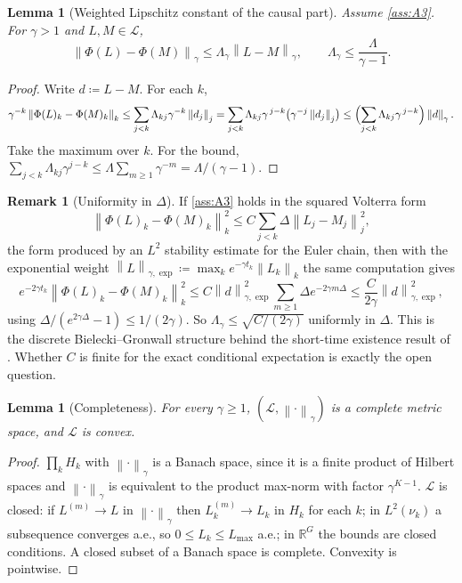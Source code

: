 \documentclass[11pt,a4paper]{article}
\theoremstyle{plain}
\newtheorem{lemma}[theorem]{Lemma}
\theoremstyle{definition}
\theoremstyle{definition}
\newtheorem{remark}[theorem]{Remark}
\newcommand{\R}{\mathbb{R}}
\newcommand{\norm}[1]{\left\lVert #1 \right\rVert}
\newcommand{\Lev}{L}
\newcommand{\Phimap}{\Phi}
\newcommand{\Lset}{\mathcal{L}}
\newcommand{\Lmax}{L_{\max}}
\begin{document}
\begin{lemma}[Weighted Lipschitz constant of the causal part]\label{lem:weighted}
Assume \cref{ass:A3}. For $\gamma > 1$ and $\Lev, M \in \Lset$,
\[
  \norm{\Phimap(\Lev) - \Phimap(M)}_\gamma \le \Lambda_\gamma \norm{\Lev - M}_\gamma, \qquad \Lambda_\gamma \le \frac{\Lambda}{\gamma - 1}.
\]
\end{lemma}

\begin{proof}
Write $d \coloneqq \Lev - M$. For each $k$,
\[
  \gamma^{-k} \norm{\Phimap(\Lev)_k - \Phimap(M)_k}_k
  \le \sum_{j < k} \Lambda_{kj} \gamma^{-k} \norm{d_j}_j
  = \sum_{j < k} \Lambda_{kj} \gamma^{\,j-k} \bigl( \gamma^{-j} \norm{d_j}_j \bigr)
  \le \Bigl( \sum_{j < k} \Lambda_{kj} \gamma^{\,j-k} \Bigr) \norm{d}_\gamma .
\]
Take the maximum over $k$. For the bound, $\sum_{j < k} \Lambda_{kj} \gamma^{j-k} \le \Lambda \sum_{m \ge 1} \gamma^{-m} = \Lambda/(\gamma - 1)$.
\end{proof}

\begin{remark}[Uniformity in $\Delta$]\label{rem:uniform}
If \cref{ass:A3} holds in the squared Volterra form
\[
  \norm{\Phimap(\Lev)_k - \Phimap(M)_k}_k^2 \le C \sum_{j < k} \Delta \norm{\Lev_j - M_j}_j^2,
\]
the form produced by an $L^2$ stability estimate for the Euler chain, then with the exponential weight $\norm{\Lev}_{\gamma, \exp} \coloneqq \max_k e^{-\gamma t_k} \norm{\Lev_k}_k$ the same computation gives
\[
  e^{-2\gamma t_k} \norm{\Phimap(\Lev)_k - \Phimap(M)_k}_k^2
  \le C \norm{d}^2_{\gamma, \exp} \sum_{m \ge 1} \Delta e^{-2\gamma m \Delta}
  \le \frac{C}{2\gamma} \norm{d}^2_{\gamma, \exp},
\]
using $\Delta / (e^{2\gamma\Delta} - 1) \le 1/(2\gamma)$. So $\Lambda_\gamma \le \sqrt{C/(2\gamma)}$ uniformly in $\Delta$. This is the discrete Bielecki--Gronwall structure behind the short-time existence result of \citet{abergel2010}. Whether $C$ is finite for the exact conditional expectation is exactly the open question.
\end{remark}

\begin{lemma}[Completeness]\label{lem:complete}
For every $\gamma \ge 1$, $(\Lset, \norm{\cdot}_\gamma)$ is a complete metric space, and $\Lset$ is convex.
\end{lemma}

\begin{proof}
$\prod_k H_k$ with $\norm{\cdot}_\gamma$ is a Banach space, since it is a finite product of Hilbert spaces and $\norm{\cdot}_\gamma$ is equivalent to the product max-norm with factor $\gamma^{K-1}$. $\Lset$ is closed: if $\Lev^{(m)} \to \Lev$ in $\norm{\cdot}_\gamma$ then $\Lev^{(m)}_k \to \Lev_k$ in $H_k$ for each $k$; in $L^2(\nu_k)$ a subsequence converges a.e., so $0 \le \Lev_k \le \Lmax$ a.e.; in $\R^G$ the bounds are closed conditions. A closed subset of a Banach space is complete. Convexity is pointwise.
\end{proof}
\end{document}

